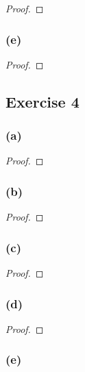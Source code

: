 \documentclass[14pt]{extarticle}
\begin{document}
\begin{proof}

\end{proof}

\subsubsection{(e)}

\begin{proof}

\end{proof}

\subsection{Exercise 4}

\subsubsection{(a)}

\begin{proof}

\end{proof}

\subsubsection{(b)}

\begin{proof}

\end{proof}

\subsubsection{(c)}

\begin{proof}

\end{proof}

\subsubsection{(d)}

\begin{proof}

\end{proof}

\subsubsection{(e)}
\end{document}
